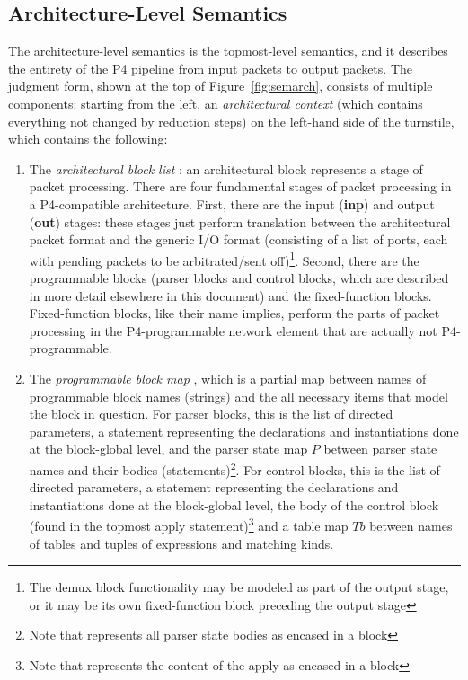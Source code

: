 \documentclass[UTF8]{article}
\begin{document}
\subsection{Architecture-Level Semantics}
The architecture-level semantics is the topmost-level semantics, and it describes the entirety of the P4 pipeline from input packets to output packets. The judgment form, shown at the top of Figure~\ref{fig:semarch}, consists of multiple components: starting from the left, an \emph{architectural context} \actx{} (which contains everything not changed by reduction steps) on the left-hand side of the turnstile, which contains the following:
\begin{enumerate}
\item The \emph{architectural block list} \abl{}: an architectural block represents a stage of packet processing. There are four fundamental stages of packet processing in a P4-compatible architecture. First, there are the input (\textbf{inp}) and output (\textbf{out}) stages: these stages just perform translation between the architectural packet format and the generic I/O format (consisting of a list of ports, each with pending packets to be arbitrated/sent off)\footnote{The demux block functionality may be modeled as part of the output stage, or it may be its own fixed-function block preceding the output stage}. Second, there are the programmable blocks (parser blocks and control blocks, which are described in more detail elsewhere in this document) and the fixed-function blocks. Fixed-function blocks, like their name implies, perform the parts of packet processing in the P4-programmable network element that are actually not P4-programmable.
\item The \emph{programmable block map} \pbm{}, which is a partial map between names of programmable block names (strings) and the all necessary items that model the block in question. For parser blocks, this is the list of directed parameters, a statement representing the declarations and instantiations done at the block-global level, and the parser state map $P$ between parser state names and their bodies (statements)\footnote{Note that \pfott{} represents all parser state bodies as encased in a block}. For control blocks, this is the list of directed parameters, a statement representing the declarations and instantiations done at the block-global level, the body of the control block (found in the topmost apply statement)\footnote{Note that \pfott{} represents the content of the apply as encased in a block} and a table map $\mathit{Tb}$ between names of tables and tuples of expressions and matching kinds.

\end{enumerate}
\end{document}
